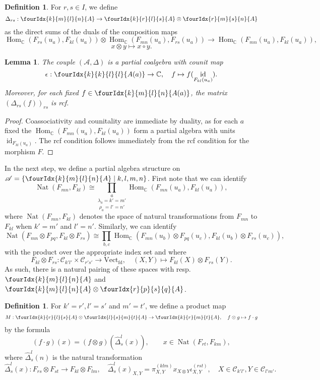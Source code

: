 \documentclass[10pt]{article}
\DeclareMathOperator{\fin}{\mathrm{fd}}
\DeclareMathOperator{\id}{id}
\DeclareMathOperator{\Hom}{Hom}
\DeclareMathOperator{\Nat}{\mathrm{Nat}}
\newcommand{\C}{\mathbb{C}}
\newcommand{\CatC}{\mathcal{C}}
\newcommand{\Vect}{\mathrm{Vect}}
\newcommand{\Gr}[5]{\fourIdx{#2}{#4}{#3}{#5}{#1}}%
\newtheorem{Lem}[Theorem]{Lemma}
\theoremstyle{definition}
\newtheorem{Def}[Theorem]{Definition}
\numberwithin{equation}{section}
\begin{document}
\begin{Def} For $r,s\in I$, we define \[\Delta_{rs}: \Gr{A}{k}{l}{m}{n}\rightarrow \Gr{A}{k}{l}{r}{s}\otimes \Gr{A}{r}{s}{m}{n}\] as the direct sums of the duals of the composition maps \[\Hom_{\C}(F_{rs}(u_a),F_{kl}(u_a)) \otimes \Hom_{\C}(F_{mn}(u_a),F_{rs}(u_a))\rightarrow \Hom_{\C}(F_{mn}(u_a),F_{kl}(u_a)),\]\[x\otimes y \mapsto x\circ y.\]
\end{Def} 

\begin{Lem} The couple $(\mathscr{A},\Delta)$ is a partial coalgebra with counit map \[\epsilon:\Gr{A(a)}{k}{l}{k}{l}\rightarrow \C,\quad f\mapsto f(\id_{F_{kl}(u_a)}).\] Moreover, for each fixed $f\in \Gr{A(a)}{k}{l}{m}{n}$, the matrix $\left(\Delta_{rs}(f)\right)_{rs}$ is rcf.
\end{Lem} 
\begin{proof} Coassociativity and counitality are immediate by duality, as for each $a$ fixed the $\Hom_{\C}(F_{mn}(u_a),F_{kl}(u_a))$ form a partial algebra with units $\id_{F_{kl}(u_a)}$. The rcf condition follows immediately from the rcf condition for the morphism $F$.
\end{proof}

In the next step, we define a partial algebra structure on $\mathscr{A} = \{\Gr{A}{k}{l}{m}{n}\mid k,l,m,n\}$. First note that we can identify \[\Nat(F_{mn},F_{kl}) \cong \underset{\rho_a=l'=n'}{\underset{\lambda_a=k'=m'}{\prod_a}} \Hom_{\C}(F_{mn}(u_a),F_{kl}(u_a)),\] where $\Nat(F_{mn},F_{kl})$ denotes the space of natural transformations from $F_{mn}$ to $F_{kl}$ when $k'=m'$ and $l'=n'$. Similarly, we can identify \[\Nat(F_{mn}\otimes F_{pq},F_{kl}\otimes F_{rs}) \cong  \prod_{b,c} \Hom_{\C}(F_{mn}(u_b)\otimes F_{pq}(u_c) ,F_{kl}(u_b)\otimes F_{rs}(u_c)),\] with the product over the appropriate index set and where \[F_{kl}\otimes F_{rs}:\CatC_{k'l'}\times \CatC_{r's'}\rightarrow \Vect_{\fin},\quad (X,Y) \mapsto F_{kl}(X)\otimes F_{rs}(Y).\] As such, there is a natural pairing of these spaces with resp.~ $\Gr{A}{k}{l}{m}{n}$ and $\Gr{A}{k}{l}{m}{n}\otimes \Gr{A}{r}{s}{p}{q}$. 

\begin{Def} For $k'=r', l'=s'$ and $m'=t'$, we define a product map \[M:\Gr{A}{k}{l}{r}{s} \otimes \Gr{A}{l}{m}{s}{t}\rightarrow  \Gr{A}{k}{m}{r}{t},\quad f\otimes g \mapsto f\cdot g\] by the formula \[(f\cdot g)(x) = (f\otimes g)( \hat{\Delta}^{l}_{s}(x)), \qquad  x \in \Nat(F_{rt},F_{km}),\] where $\hat{\Delta}^l_s(n)$ is the natural transformation\[\hat{\Delta}^l_s(x):  F_{rs}\otimes F_{st}\rightarrow F_{kl}\otimes F_{lm},\quad \hat{\Delta}^l_s(x)_{X,Y} = \pi^{(klm)}_{X,Y}x_{X\otimes Y} \iota^{(rst)}_{X,Y},\quad X\in \CatC_{k'l'},Y\in \CatC_{l'm'}.\]
\end{Def}
\end{document}
